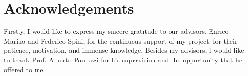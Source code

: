\chapter{Acknowledgements}
\label{cha:acknowledgements}

Firstly, I would like to express my sincere gratitude to our advisors, Enrico Marino and Federico Spini, for the continuous support of my project, for their patience, motivation, and immense knowledge. Besides my advisors, I would like to thank Prof. Alberto Paoluzzi for his supervision and the opportunity that he offered to me.
